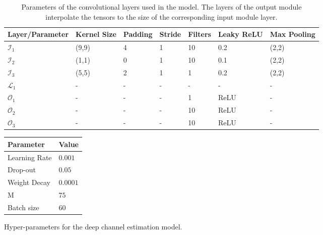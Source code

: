 \begin{table}[]
\begin{tabular}{@{}lllllll@{}}
\toprule
Layer/Parameter & Kernel Size & Padding & Stride & Filters & Leaky ReLU & Max Pooling \\ \midrule
$\mathcal{I}_1$            & (9,9)       & 4       & 1      & 10      & 0.2        & (2,2)       \\
$\mathcal{I}_2$              & (1,1)       & 0       & 1      & 10      & 0.1        & (2,2)       \\
$\mathcal{I}_3$            & (5,5)       & 2       & 1      & 1       & 0.2        & (2,2)       \\
$\mathcal{L}_1$              & -           & -       & -      & -      & -          & -           \\
$\mathcal{O}_1$              & -           & -       & -      & 1       & ReLU       & -           \\
$\mathcal{O}_2$               & -           & -       & -      & 10      & ReLU       & -           \\
$\mathcal{O}_3$               & -           & -       & -      & 10      & ReLU       & -           \\ \bottomrule
\end{tabular}
\vspace{2em}
\caption{Parameters of the convolutional layers used in the model. The layers of the output module interpolate the tensors to the size of the corresponding input module layer.}\label{tab:channel_estimation_hyperparameters_conv}
\end{table}

\begin{margintable}
\begin{tabular}{@{}ll@{}}
Parameter     & Value  \\ \midrule
Learning Rate & $0.001$  \\
Drop-out      & $0.05$   \\
Weight Decay  & $0.0001$ \\
M             & $75$     \\
Batch size    & $60$    \\ \bottomrule
\end{tabular}
\caption{Hyper-parameters for the deep channel estimation model.}\label{tab:channel_estimation_hyperparameters}
\end{margintable}


